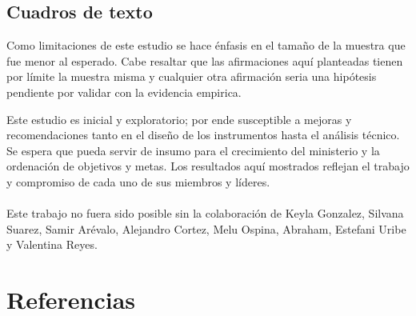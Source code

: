 \documentclass{beamer}
\begin{document}

\subsection{Cuadros de texto}
\begin{frame}{}
\vspace{-0.9\baselineskip}
\begin{tcolorbox}[colback=backframe_color,colframe=beamer_color,title= Limitaciones] 

Como limitaciones de este estudio se hace énfasis en el tamaño de la muestra que fue menor al esperado. Cabe resaltar que las afirmaciones aquí planteadas tienen por límite la muestra misma y cualquier otra afirmación seria una hipótesis pendiente por validar con la evidencia empirica.

Este estudio es inicial y exploratorio; por ende susceptible a mejoras y recomendaciones tanto en el diseño de los instrumentos hasta el análisis técnico. Se espera que pueda servir de insumo para el crecimiento del ministerio y la ordenación de objetivos y metas. Los resultados aquí mostrados reflejan el trabajo y compromiso de cada uno de sus miembros y líderes. 
\\\\
Este trabajo no fuera sido posible sin la colaboración de Keyla Gonzalez, Silvana Suarez, Samir Arévalo, Alejandro Cortez, Melu Ospina, Abraham, Estefani Uribe y Valentina Reyes. 
\end{tcolorbox}
\end{frame}




\section{Referencias}
%
%
\begin{frame}
    \maketitle
\end{frame}
\end{document}
